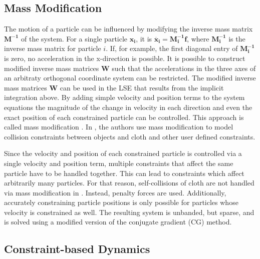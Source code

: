 \documentclass{article}
\begin{document}
\subsection*{Mass Modification}
The motion of a particle can be influenced by modifying the inverse mass matrix $\bm{M^{-1}}$ of the system. 
For a single particle $\bm{x_i}$, it is $\ddot{\bm{x_i}} = \bm{M_i^{-1} f}$, where $\bm{M_i^{-1}}$ is the inverse mass matrix for 
particle $i$. If, for example, the first diagonal entry of $\bm{M_i^{-1}}$ is zero, no acceleration in the x-direction is possible. 
It is possible to construct modified inverse mass matrices $\bm{W}$ such that the accelerations in the three axes of an arbitraty 
orthogonal coordinate system can be restricted. The modified inverse mass matrices $\bm{W}$ can be used in the LSE that results 
from the implicit integration above. By adding simple velocity and position terms to the system equations the magnitude of the 
change in velocity in each direction and even the exact position of each constrained particle can be controlled. This approach is
called mass modification \cite{baraff1998}. In \cite{baraff1998}, the authors use mass modification to model collision constraints 
between objects and cloth and other user defined constraints. 

Since the velocity and position of each constrained particle is controlled via a single velocity and position term, multiple 
constraints that affect the same particle have to be handled together. This can lead to constraints which affect arbitrarily many
particles. For that reason, self-collisions of cloth are not handled via mass modification in \cite{baraff1998}. Instead, penalty
forces are used. Additionally, accurately constraining particle positions is only possible for particles whose velocity is 
constrained as well. The resulting system is unbanded, but sparse, and is solved using a modified version of the conjugate gradient
(CG) method.

\subsection*{Constraint-based Dynamics}
\end{document}
